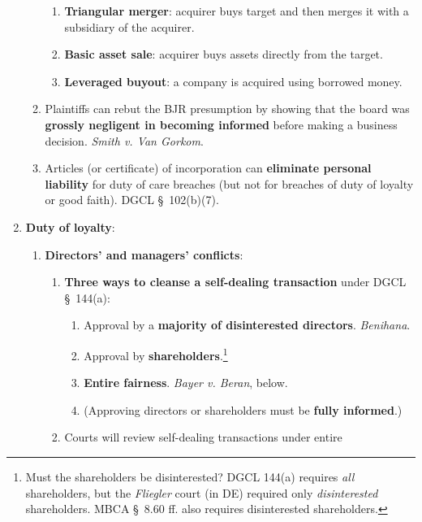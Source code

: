 \begin{enumerate}
\begin{enumerate}
\begin{enumerate}
            \item \textbf{Triangular merger}: acquirer buys target and then 
            merges it with a subsidiary of the acquirer.
            \item \textbf{Basic asset sale}: acquirer buys assets directly 
            from the target.
            \item \textbf{Leveraged buyout}: a company is acquired using 
            borrowed money.
        \end{enumerate}
        \item Plaintiffs can rebut the BJR presumption by showing that the 
        board was \textbf{grossly negligent in becoming informed} before 
        making a business decision. \emph{Smith v. Van Gorkom}. %
        \item Articles (or certificate) of incorporation can \textbf{eliminate 
        personal liability} for duty of care breaches (but not for breaches of 
        duty of loyalty or good faith). DGCL \S\ 102(b)(7).
    \end{enumerate}
    \item \textbf{Duty of loyalty}:
    \begin{enumerate}
        \item \textbf{Directors' and managers' conflicts}:
        \begin{enumerate}
            \item \textbf{Three ways to cleanse a self-dealing transaction} 
            under DGCL \S\ 144(a):
            \begin{enumerate}
                \item Approval by a \textbf{majority of disinterested 
                directors}. \emph{Benihana}. %
                \item Approval by \textbf{shareholders}.\footnote{Must the 
                shareholders be disinterested? DGCL 144(a) requires \emph{all} 
                shareholders, but the \emph{Fliegler} court (in DE) required 
                only \emph{disinterested} shareholders. MBCA \S\ 8.60 ff. also 
                requires disinterested shareholders.}
                \item \textbf{Entire fairness}. \emph{Bayer v. Beran}, below.
                \item (Approving directors or shareholders must be 
                \textbf{fully informed}.)
            \end{enumerate}
            \item Courts will review self-dealing transactions under entire 

\end{enumerate}
\end{enumerate}
\end{enumerate}
